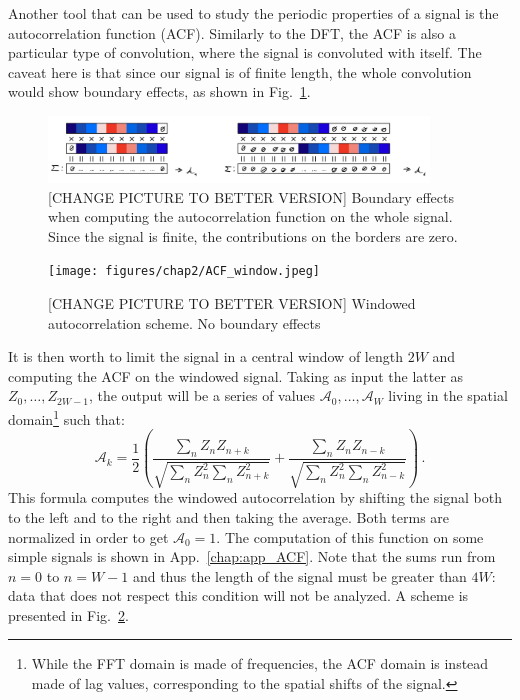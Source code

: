 Another tool that can be used to study the periodic properties of a signal is the autocorrelation function (ACF). Similarly to the DFT, the ACF is also a particular type of convolution, where the signal is convoluted with itself. The caveat here is that since our signal is of finite length, the whole convolution would show boundary effects, as shown in Fig.\ \ref{fig:ACF_bound}.
\begin{figure}[h!]
    \centering
    \includegraphics[width=0.9\textwidth]{figures/chap2/ACF_bound.jpeg}
    \caption{[CHANGE PICTURE TO BETTER VERSION] Boundary effects when computing the autocorrelation function on the whole signal. Since the signal is finite, the contributions on the borders are zero.}
    \label{fig:ACF_bound}
\end{figure}
\begin{figure}[h!]
    \centering
    \texttt{[image: figures/chap2/ACF\_window.jpeg]}
    \caption{[CHANGE PICTURE TO BETTER VERSION] Windowed autocorrelation scheme. No boundary effects}
    \label{fig:ACF_window}
\end{figure}
It is then worth to limit the signal in a central window of length $2W$ and computing the ACF on the windowed signal. Taking as input the latter as $Z_0,\dots,Z_{2W-1}$, the output will be a series of values $\mathcal{A}_0,\dots,\mathcal{A}_{W}$ living in the spatial domain\footnote{While the FFT domain is made of frequencies, the ACF domain is instead made of lag values, corresponding to the spatial shifts of the signal.} such that:
\begin{equation*}
    \mathcal{A}_k = \frac{1}{2} \left( \frac{\sum_{n} Z_n Z_{n+k}}{\sqrt{\sum_{n} Z_n^2 \sum_{n} Z_{n+k}^2}} + \frac{\sum_{n} Z_n Z_{n-k}}{\sqrt{\sum_{n} Z_n^2 \sum_{n} Z_{n-k}^2}} \right)\, .
\end{equation*}
This formula computes the windowed autocorrelation by shifting the signal both to the left and to the right and then taking the average.
Both terms are normalized in order to get $\mathcal{A}_0 = 1$. The computation of this function on some simple signals is shown in App.\ \ref{chap:app_ACF}. Note that the sums run from $n = 0$ to $n = W-1$ and thus the length of the signal must be greater than $4W$: data that does not respect this condition will not be analyzed. A scheme is presented in Fig.\ \ref{fig:ACF_window}.

